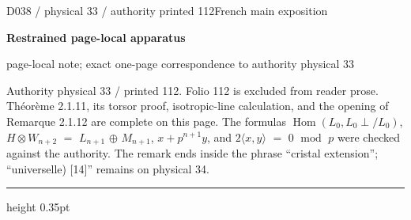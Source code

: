 \documentclass[9pt]{article}
\newcommand{\CanonText}[1]{\par{\fontsize{8.0}{9.35}\selectfont\RaggedRight #1\par}\vspace{2.2pt}}
\newcommand{\LayerTitle}{Restrained page-local apparatus}
\begin{document}
\noindent\begin{minipage}[t][\dimexpr\textheight-5pt\relax][t]{\textwidth}
{\sffamily\fontsize{7.3}{8.2}\selectfont\color{Quiet} D038 / physical 33 / authority printed 112\hfill French main exposition}
\par{}\vspace{4.5pt}
{\sffamily\fontsize{10.4}{11.6}\selectfont\bfseries\color{Accent} \LayerTitle}
\par{\sffamily\fontsize{6.7}{7.7}\selectfont\color{Quiet} page-local note; exact one-page correspondence to authority physical 33}
\vspace{5pt}
\CanonText{Authority physical 33 / printed 112. Folio 112 is excluded from reader prose. Théorème 2.1.11, its torsor proof, isotropic-line calculation, and the opening of Remarque 2.1.12 are complete on this page. The formulas \(\operatorname{Hom}(L_{0},L_{0}\perp{}/L_{0})\), \(H\otimes{}W_{n+2}\) \(=\) \(L_{n+1}\) \(\oplus{}\) \(M_{n+1}\), \(x+p^{n+1}y\), and \(2\langle{}x,y\rangle{}\) \(=\) 0 \(\operatorname{mod}\) \(p\) were checked against the authority. The remark ends inside the phrase “cristal extension”; “universelle) [14]” remains on physical 34.}
\vfill
{\color{Accent}\hrule height 0.35pt}\vspace{3pt}
\end{minipage}
\newpage
\end{document}
